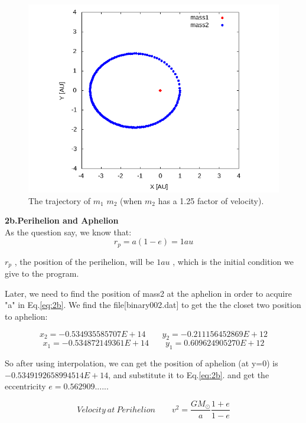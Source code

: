 \documentclass{article}
\begin{document}
\begin{figure}[h]
    \centering 
	\includegraphics[scale=0.5]{pro2_a.png}
	\caption{The trajectory of $m_1$ $m_2$ (when $m_2$ has a 1.25 factor of velocity).} %
	\label{fig:pro2_a} %
\end{figure}


\textbf{2b.Perihelion and Aphelion}\\
As the question say, we know that:
\begin{equation}
r_p=a(1-e)=1au
\label{eq:2b}
\end{equation}

$r_p$ , the position of the perihelion, will be $1au$ , which is the initial condition we give to the program.

Later, we need to find the position of mass2 at the aphelion in order to acquire "a" in Eq.\ref{eq:2b}. We find the file[binary002.dat] to get the the closet two position to aphelion:

$$x_2=-0.534935585707E+14  \qquad  y_2=-0.211156452869E+12$$
$$x_1=-0.534872149361E+14  \qquad  y_1=0.609624905270E+12$$

So after using interpolation, we can get the position of aphelion (at y=0) is $-0.5349192658994514E+14$, and substitute it to Eq.\ref{eq:2b}. and get the eccentricity $e=0.562909......$

\begin{equation}
Velocity\ at\ Perihelion \qquad v^2= \frac{GM_\odot}{a} \frac{1+e}{1-e}
\label{eq:2b_+}
\end{equation}
\end{document}
